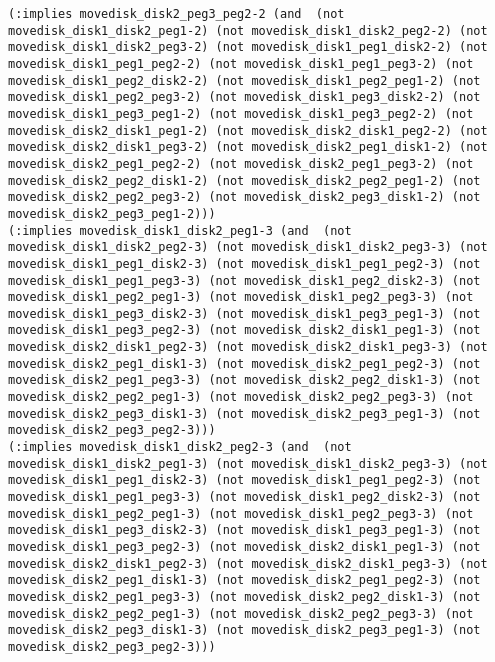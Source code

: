 \documentclass[12pt,letterpaper]{ntdhw}
\begin{document}
\begin{enumerate}
\begin{enumerate}
\begin{lstlisting}[language=pddl, style=pddlstyle,
  basicstyle=\scriptsize]
(:implies movedisk_disk2_peg3_peg2-2 (and  (not movedisk_disk1_disk2_peg1-2) (not movedisk_disk1_disk2_peg2-2) (not movedisk_disk1_disk2_peg3-2) (not movedisk_disk1_peg1_disk2-2) (not movedisk_disk1_peg1_peg2-2) (not movedisk_disk1_peg1_peg3-2) (not movedisk_disk1_peg2_disk2-2) (not movedisk_disk1_peg2_peg1-2) (not movedisk_disk1_peg2_peg3-2) (not movedisk_disk1_peg3_disk2-2) (not movedisk_disk1_peg3_peg1-2) (not movedisk_disk1_peg3_peg2-2) (not movedisk_disk2_disk1_peg1-2) (not movedisk_disk2_disk1_peg2-2) (not movedisk_disk2_disk1_peg3-2) (not movedisk_disk2_peg1_disk1-2) (not movedisk_disk2_peg1_peg2-2) (not movedisk_disk2_peg1_peg3-2) (not movedisk_disk2_peg2_disk1-2) (not movedisk_disk2_peg2_peg1-2) (not movedisk_disk2_peg2_peg3-2) (not movedisk_disk2_peg3_disk1-2) (not movedisk_disk2_peg3_peg1-2)))
(:implies movedisk_disk1_disk2_peg1-3 (and  (not movedisk_disk1_disk2_peg2-3) (not movedisk_disk1_disk2_peg3-3) (not movedisk_disk1_peg1_disk2-3) (not movedisk_disk1_peg1_peg2-3) (not movedisk_disk1_peg1_peg3-3) (not movedisk_disk1_peg2_disk2-3) (not movedisk_disk1_peg2_peg1-3) (not movedisk_disk1_peg2_peg3-3) (not movedisk_disk1_peg3_disk2-3) (not movedisk_disk1_peg3_peg1-3) (not movedisk_disk1_peg3_peg2-3) (not movedisk_disk2_disk1_peg1-3) (not movedisk_disk2_disk1_peg2-3) (not movedisk_disk2_disk1_peg3-3) (not movedisk_disk2_peg1_disk1-3) (not movedisk_disk2_peg1_peg2-3) (not movedisk_disk2_peg1_peg3-3) (not movedisk_disk2_peg2_disk1-3) (not movedisk_disk2_peg2_peg1-3) (not movedisk_disk2_peg2_peg3-3) (not movedisk_disk2_peg3_disk1-3) (not movedisk_disk2_peg3_peg1-3) (not movedisk_disk2_peg3_peg2-3)))
(:implies movedisk_disk1_disk2_peg2-3 (and  (not movedisk_disk1_disk2_peg1-3) (not movedisk_disk1_disk2_peg3-3) (not movedisk_disk1_peg1_disk2-3) (not movedisk_disk1_peg1_peg2-3) (not movedisk_disk1_peg1_peg3-3) (not movedisk_disk1_peg2_disk2-3) (not movedisk_disk1_peg2_peg1-3) (not movedisk_disk1_peg2_peg3-3) (not movedisk_disk1_peg3_disk2-3) (not movedisk_disk1_peg3_peg1-3) (not movedisk_disk1_peg3_peg2-3) (not movedisk_disk2_disk1_peg1-3) (not movedisk_disk2_disk1_peg2-3) (not movedisk_disk2_disk1_peg3-3) (not movedisk_disk2_peg1_disk1-3) (not movedisk_disk2_peg1_peg2-3) (not movedisk_disk2_peg1_peg3-3) (not movedisk_disk2_peg2_disk1-3) (not movedisk_disk2_peg2_peg1-3) (not movedisk_disk2_peg2_peg3-3) (not movedisk_disk2_peg3_disk1-3) (not movedisk_disk2_peg3_peg1-3) (not movedisk_disk2_peg3_peg2-3)))

\end{lstlisting}
\end{enumerate}
\end{enumerate}
\end{document}

